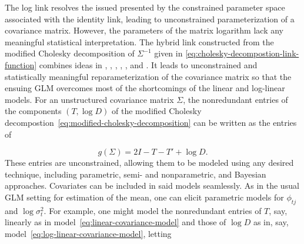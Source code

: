 
The log link resolves the issued presented by the constrained parameter space associated with the identity link, leading to unconstrained parameterization of a covariance matrix. However, the parameters of the matrix logarithm lack any meaningful statistical interpretation. The hybrid link  constructed from the modified Cholesky decomposition of $\Sigma^{-1}$ given in \ref{eq:cholesky-decompostion-link-function} combines ideas in \citet{edgeworth1892xxii}, \citet{gabriel1962ante}, \citet{anderson1973asymptotically}, \citet{dempster1972covariance}, \citet{chiu1996matrix}, and \citet{zimmerman1997structured}. It leads to unconstrained and statistically meaningful reparameterization of the covariance matrix so that the ensuing GLM overcomes most of the shortcomings of the linear and log-linear models.  For an unstructured covariance matrix $\Sigma$, the nonredundant entries of the components $\left(T, \log D\right)$ of the modified Cholesky decompostion~\ref{eq:modified-cholesky-decomposition} can be written as the entries of 

\begin{equation}\label{eq:cholesky-decompostion-link-function}
g\left( \Sigma \right) = 2I - T - T' + \log D.
\end{equation}
\noindent
These entries are unconstrained, allowing them to be modeled using any desired technique, including parametric, semi- and nonparametric, and Bayesian approaches. Covariates can be included in said models seamlessly. As in the usual GLM setting for estimation of the mean, one can elicit parametric models for $\phi_{tj}$ and $\log\sigma_t^2$.  For example, one might model the nonredundant entries of $T$, say, linearly as in model~\ref{eq:linear-covariance-model} and those of $\log D$ as in, say, model~\ref{eq:log-linear-covariance-model}, letting

